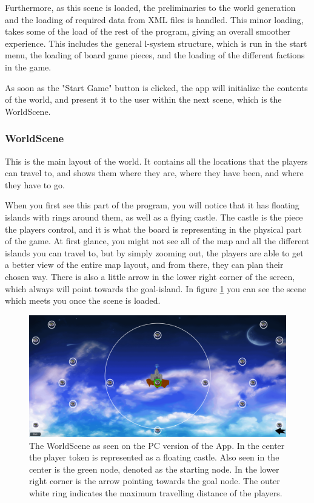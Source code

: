 Furthermore, as this scene is loaded, the preliminaries to the world generation and the loading of required data from XML files is handled. This minor loading, takes some of the load of the rest of the program, giving an overall smoother experience.
This includes the general l-system structure, which is run in the start menu, the loading of board game pieces, and the loading of the different factions in the game.

As soon as the "Start Game" button is clicked, the app will initialize the contents of the world, and present it to the user within the next scene, which is the WorldScene.

\subsubsection{WorldScene}
\label{sec:worldscene}
This is the main layout of the world. It contains all the locations that the players can travel to, and shows them where they are, where they have been, and where they have to go.

When you first see this part of the program, you will notice that it has floating islands with rings around them, as well as a flying castle. The castle is the piece the players control, and it is what the board is representing in the physical part of the game.
At first glance, you might not see all of the map and all the different islands you can travel to, but by simply zooming out, the players are able to get a better view of the entire map layout, and from there, they can plan their chosen way. There is also a little arrow in the lower right corner of the screen, which always will point towards the goal-island. 
In figure \ref{fig:worldSc} you can see the scene which meets you once the scene is loaded.

\begin{figure}[!ht]
    \centering
    \includegraphics[scale=0.3]{Images/WorldScene.png}
    \caption{The WorldScene as seen on the PC version of the App. In the center the player token is represented as a floating castle. Also seen in the center is the green node, denoted as the starting node. In the lower right corner is the arrow pointing towards the goal node. The outer white ring indicates the maximum travelling distance of the players.}
    \label{fig:worldSc}
\end{figure}

